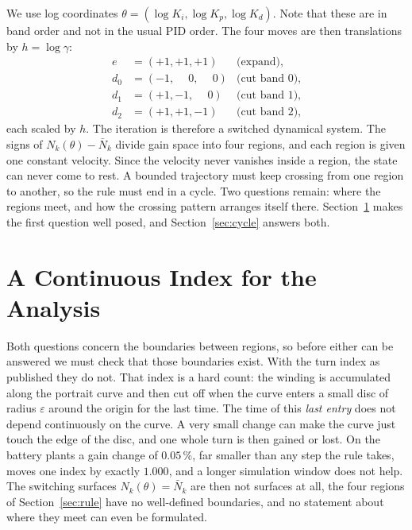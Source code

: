 \documentclass[letterpaper, 10pt, conference, twocolumn]{ieeeconf}
\newcommand{\Nbar}{\bar{N}}
\begin{document}
We use log coordinates $\theta = (\log K_i, \log K_p, \log K_d)$. Note that
these are in band order and not in the usual PID order. The four moves are then
translations by $h = \log\gamma$:
\begin{equation}
\begin{aligned}
e   &= (+1, +1, +1) &\text{(expand),}\\
d_0 &= (-1, \phantom{+}0, \phantom{+}0) &\text{(cut band 0),}\\
d_1 &= (+1, -1, \phantom{+}0) &\text{(cut band 1),}\\
d_2 &= (+1, +1, -1) &\text{(cut band 2),}
\end{aligned}
\label{eq:moves}
\end{equation}
each scaled by $h$. The iteration is therefore a switched dynamical system.
The signs of $N_k(\theta) - \Nbar_k$ divide gain space into four regions, and
each region is given one constant velocity. Since the velocity never vanishes
inside a region, the state can never come to rest. A bounded trajectory must
keep crossing from one region to another, so the rule must end in a cycle. Two
questions remain: where the regions meet, and how the crossing pattern arranges
itself there. Section~\ref{sec:index} makes the first question well posed, and
Section~\ref{sec:cycle} answers both.

\section{A Continuous Index for the Analysis}
\label{sec:index}

Both questions concern the boundaries between regions, so before either can be
answered we must check that those boundaries exist. With the turn index as
published they do not. That index is a hard count: the
winding is accumulated along the portrait curve and then cut off when the curve
enters a small disc of radius $\varepsilon$ around the origin for the last
time. The time of this \emph{last entry} does not depend continuously on the
curve. A very small change can make the curve just touch the edge of the disc,
and one whole turn is then gained or lost. On the battery plants a gain change
of $0.05\,\%$, far smaller than any step the rule takes, moves one index by
exactly $1.000$, and a longer simulation window does not help. The switching
surfaces $N_k(\theta) = \Nbar_k$ are then not surfaces at all, the four regions
of Section~\ref{sec:rule} have no well-defined boundaries, and no statement
about where they meet can even be formulated.
\end{document}

